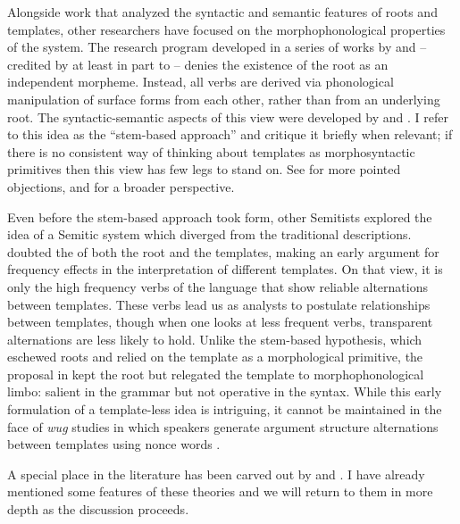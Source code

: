\begin{exe}
\begin{xlist}
\begin{exe}
\begin{exe}
\begin{exe}
\begin{exe}
\begin{xlist}
\begin{exe}
\begin{xlist}
\begin{xlist}
\begin{xlist}
\begin{exe}
\begin{xlist}
Alongside work that analyzed the syntactic and semantic features of roots and templates, other researchers have focused on the morphophonological properties of the system. The research program developed in a series of works by \cite{batel89,batel94} and \cite{ussishkin99,ussishkin00phd,ussishkin05} -- credited by \cite{ussishkin00phd} at least in part to \cite{horvath81} -- denies the existence of the root as an independent morpheme. Instead, all verbs are derived via phonological manipulation of surface forms from each other, rather than from an underlying root. The syntactic-semantic aspects of this view were developed by \cite{reinhartsiloni05} and \cite{laks11,laks13morpho,laks14,laks18}. I refer to this idea as the ``stem-based approach'' and critique it briefly when relevant; if there is no consistent way of thinking about templates as morphosyntactic primitives then this view has few legs to stand on. See \cite{kastner17gjgl,kastner18nllt} for more pointed objections, and \cite{kastnertucker19cup} for a broader perspective.

Even before the stem-based approach took form, other Semitists explored the idea of a Semitic system which diverged from the traditional descriptions. \cite{schwarzwald73} doubted the  of both the root and the templates, making an early argument for frequency effects in the interpretation of different templates. On that view, it is only the high frequency verbs of the language that show reliable alternations between templates. These verbs lead us as analysts to postulate relationships between templates, though when one looks at less frequent verbs, transparent alternations are less likely to hold. Unlike the stem-based hypothesis, which eschewed roots and relied on the template as a morphological primitive, the proposal in \cite{schwarzwald73} kept the root but relegated the template to morphophonological limbo: salient in the grammar but not operative in the syntax. While this early formulation of a template-less idea is intriguing, it cannot be maintained in the face of \emph{wug} studies in which speakers generate argument structure alternations between templates using nonce words \citep{berman93jcl,moorecantwell13}.

A special place in the literature has been carved out by \cite{doron03,doron13voice} and \cite{arad03,arad05}. I have already mentioned some features of these theories and we will return to them in more depth as the discussion proceeds.


\end{xlist}
\end{exe}
\end{xlist}
\end{xlist}
\end{xlist}
\end{exe}
\end{xlist}
\end{exe}
\end{exe}
\end{exe}
\end{exe}
\end{xlist}
\end{exe}
